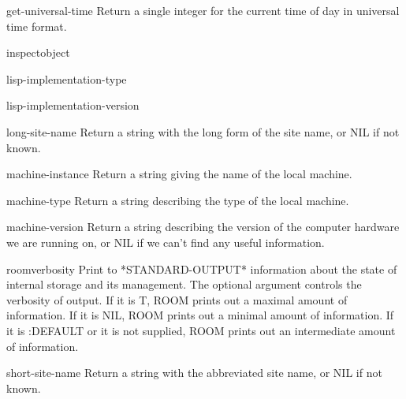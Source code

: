 \documentclass[10pt,english]{book}
\begin{document}
\begin{function}{get-universal-time}{}
  Return a single integer for the current time of day in universal time
format.
\end{function}

\begin{function}{inspect}{object}
  
\end{function}

\begin{function}{lisp-implementation-type}{}
  
\end{function}

\begin{function}{lisp-implementation-version}{}
  
\end{function}

\begin{function}{long-site-name}{}
  Return a string with the long form of the site name, or NIL if not known.
\end{function}

\begin{function}{machine-instance}{}
  Return a string giving the name of the local machine.
\end{function}

\begin{function}{machine-type}{}
  Return a string describing the type of the local machine.
\end{function}

\begin{function}{machine-version}{}
  Return a string describing the version of the computer hardware we
are running on, or NIL if we can't find any useful information.
\end{function}

\begin{function}{room}{\op verbosity}
  Print to *STANDARD-OUTPUT* information about the state of internal
  storage and its management. The optional argument controls the
  verbosity of output. If it is T, ROOM prints out a maximal amount of
  information. If it is NIL, ROOM prints out a minimal amount of
  information. If it is :DEFAULT or it is not supplied, ROOM prints out
  an intermediate amount of information.
\end{function}

\begin{function}{short-site-name}{}
  Return a string with the abbreviated site name, or NIL if not known.
\end{function}
\end{document}
